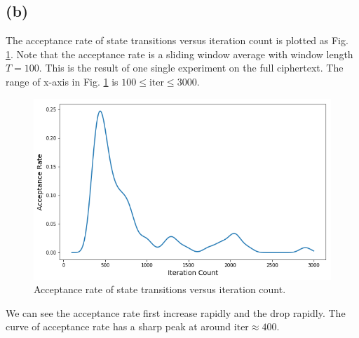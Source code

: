 \documentclass[12pt,aps,pre,reprint]{revtex4-1}
\begin{document}
\subsection{(b)}
The acceptance rate of state transitions versus iteration count is plotted as Fig. \ref{fig:acceptance-rate}. Note that the acceptance rate is a sliding window average with window length $T=100$. This is the result of one single experiment on the full ciphertext. The range of x-axis in Fig. \ref{fig:acceptance-rate} is $100\leq\text{iter}\leq3000$.  
\begin{figure}[H]
	\centering
	\includegraphics[width=\linewidth]{pics/acceptance-rate.png}
	\caption{Acceptance rate of state transitions versus iteration count.}
	\label{fig:acceptance-rate}
\end{figure}
We can see the acceptance rate first increase rapidly and the drop rapidly. The curve of acceptance rate has a sharp peak at around $\text{iter}\approx400$.
\end{document}
